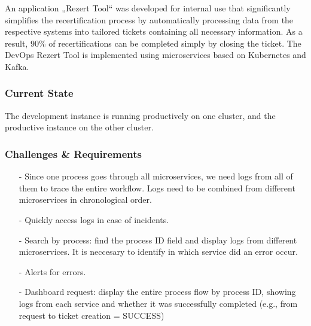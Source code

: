 \documentclass[../main.tex]{subfiles}
\begin{document}
An application „Rezert Tool“ was developed for internal use that significantly simplifies the recertification process by automatically processing data from the respective systems into tailored tickets containing all necessary information. As a result, 90\% of recertifications can be completed simply by closing the ticket.
The DevOps Rezert Tool is implemented using microservices based on Kubernetes and Kafka.

\subsubsection{Current State}

The development instance is running productively on one cluster, and the productive instance on the other cluster.

\subsubsection{Challenges \& Requirements}

\begin{enumerate}
    \item[-] Since one process goes through all microservices, we need logs from all of them to trace the entire workflow. Logs need to be combined from different microservices in chronological order.
    \item[-] Quickly access logs in case of incidents.
    \item[-] Search by process: find the process ID field and display logs from different microservices. It is neccesary to identify in which service did an error occur.
    \item[-] Alerts for errors.
    \item[-] Dashboard request: display the entire process flow by process ID, showing logs from each service and whether it was successfully completed (e.g., from request to ticket creation = SUCCESS)
\end{enumerate}
\end{document}
